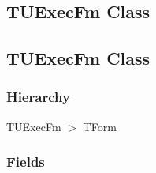 \documentclass{report}
\begin{document}
\subsection*{\large{\textbf{TUExecFm Class}}\normalsize\hspace{1ex}\hrulefill}
\else
\subsection*{TUExecFm Class}
\fi
\label{updexec.TUExecFm}
\subsubsection*{\large{\textbf{Hierarchy}}\normalsize\hspace{1ex}\hfill}
TUExecFm {$>$} TForm
\subsubsection*{\large{\textbf{Fields}}\normalsize\hspace{1ex}\hfill}
\end{document}
